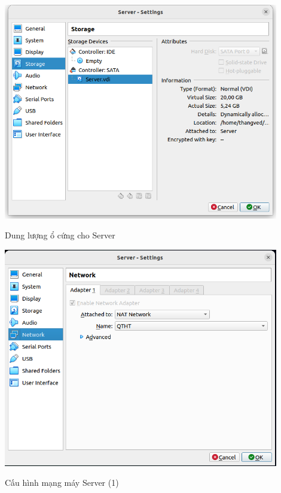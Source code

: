 \documentclass[a4paper, 11pt]{article}
\begin{document}
\begin{itemize}
\begin{enumerate}
                    \begin{minipage}
                        {\linewidth}
                        \captionsetup{type=figure}
                        \centering
                        \includegraphics[width=12cm]{images/server-disk.png}
                        \caption{Dung lượng ổ cứng cho Server}
                        \label{server-disk}
                    \end{minipage}

                    \begin{minipage}
                        {\linewidth}
                        \captionsetup{type=figure}
                        \centering
                        \includegraphics[width=12cm]{images/server-network-1.png}
                        \caption{Cấu hình mạng máy Server (1)}
                        \label{server-network-1}
                    \end{minipage}


\end{enumerate}
\end{itemize}
\end{document}
